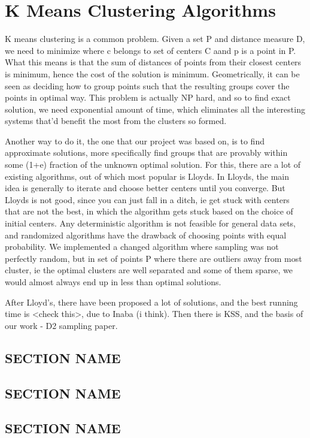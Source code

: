 \chapter{K Means Clustering Algorithms}
K means clustering is a common problem. Given a set P and distance measure D, we need to minimize  where c belongs to set of centers C aand p is a point in P. What this means is that the sum of distances of points from their closest centers is minimum, hence the cost of the solution is minimum. Geometrically, it can be seen as deciding how to group points such that the resulting groups cover the points in optimal way. This problem is actually NP hard, and so to find exact solution, we need exponential amount of time, which eliminates all the interesting systems that'd benefit the most from the clusters so formed.

Another way to do it, the one that our project was based on, is to find approximate solutions, more specifically find groups that are provably within some (1+e) fraction of the unknown optimal solution. For this, there are a lot of existing algorithms, out of which most popular is Lloyds. In Lloyds, the main idea is generally to iterate and choose better centers until you converge. But Lloyds is not good, since you can just fall in a ditch, ie get stuck with centers that are not the best, in which the algorithm gets stuck based on the choice of initial centers. Any deterministic algorithm is not feasible for general data sets, and randomized algorithms have the drawback of choosing points with equal probability. We implemented a changed algorithm where sampling was not perfectly random, but in set of points P where there are outliers away from most cluster, ie the optimal clusters are well separated and some of them sparse, we would almost always end up in less than optimal solutions.

After Lloyd's, there have been proposed a lot of solutions, and the best running time is <check this>, due to Inaba (i think). Then there is KSS, and the basis of our work - D2 sampling paper.

\section{SECTION NAME}
\lipsum[2]

\section{SECTION NAME}
\lipsum[3]

\section{SECTION NAME}
\lipsum[2]
